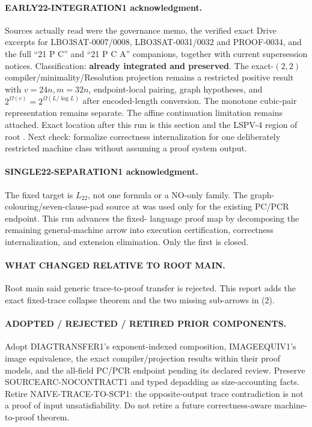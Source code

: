 \documentclass[11pt]{article}
\newcommand{\Ltwo}{L_{22}}
\begin{document}
\paragraph{EARLY22-INTEGRATION1 acknowledgment.}
Sources actually read were the governance memo, the verified exact Drive
excerpts for LBO3SAT-0007/0008, LBO3SAT-0031/0032 and PROOF-0034, and the full
``21 P C'' and ``21 P C A'' companions, together with current supersession
notices.  Classification: \textbf{already integrated and preserved}.  The
exact-\((2,2)\) compiler/minimality/Resolution projection remains a restricted
positive result with \(v=24n,m=32n\), endpoint-local pairing, graph
hypotheses, and \(2^{\Omega(v)}=2^{\Omega(L/\log L)}\) after encoded-length
conversion.  The monotone cubic-pair representation remains separate.  The
affine continuation limitation remains attached.  Exact location after this
run is this section and the LSPV-4 region of root .  Next check:
formalize correctness internalization for one deliberately restricted machine
class without assuming a proof system output.

\paragraph{SINGLE22-SEPARATION1 acknowledgment.}
The fixed target is \(\Ltwo\), not one formula or a NO-only family.  The
graph-colouring/seven-clause-pad source at
was used only for the existing PC/PCR endpoint.  This run advances the fixed-
language proof map by decomposing the remaining general-machine arrow into
execution certification, correctness internalization, and extension
elimination.  Only the first is closed.

\paragraph{WHAT CHANGED RELATIVE TO ROOT MAIN.}
Root main said generic trace-to-proof transfer is rejected.  This report adds
the exact fixed-trace collapse theorem and the two missing sub-arrows in (2).

\paragraph{ADOPTED / REJECTED / RETIRED PRIOR COMPONENTS.}
Adopt DIAGTRANSFER1's exponent-indexed composition, IMAGEEQUIV1's image
equivalence, the exact compiler/projection results within their proof models,
and the all-field PC/PCR endpoint pending its declared review.  Preserve
SOURCEARC-NOCONTRACT1 and typed depadding as size-accounting facts.  Retire
\textsf{NAIVE-TRACE-TO-SCP1}: the opposite-output trace contradiction is not a
proof of input unsatisfiability.  Do not retire a future correctness-aware
machine-to-proof theorem.
\end{document}
